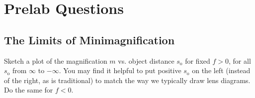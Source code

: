\documentclass[]{manual}
\begin{document}
    \newpage
    \section*{Prelab Questions}
    \setcounter{subsection}{0}

    \subsection*{The Limits of Minimagnification}

    Sketch a plot of the magnification $m$ vs. object distance $s_{\mathrm{o}}$ for fixed $f>0$, for all $s_{\mathrm{o}}$ from $\infty$ to $-\infty$.
    You may find it helpful to put positive $s_{\mathrm{o}}$ on the left (instead of the right, as is traditional) to match the way we typically draw lens diagrams.
    Do the same for $f<0$.

\end{document}
